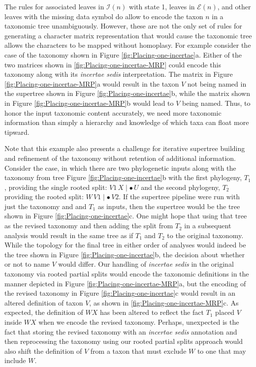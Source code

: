 \documentclass[english]{article}
\begin{document}
The rules for associated leaves in $\mathcal{I}(n)$ with state 1, leaves
     in $\mathcal{E}(n)$, and other leaves with the missing data symbol 
     do allow to encode the taxon $n$ in a taxonomic tree unambiguously.
However, these are not the only set of rules for generating a character matrix
    representation that would cause the taxonomic tree allows the characters to
    be mapped without homoplasy.
For example consider the case of the taxonomy shown in Figure \ref{fig:Placing-one-incertae}a.
Either of the two matrices shown in \ref{fig:Placing-one-incertae-MRP} could encode this
    taxonomy along with its \emph{incertae sedis} interpretation.
The matrix in Figure \ref{fig:Placing-one-incertae-MRP}a would result in the 
    taxon $V$ not being named in the supertree shown in Figure \ref{fig:Placing-one-incertae}b,
    while the matrix shown in Figure \ref{fig:Placing-one-incertae-MRP}b would lead
    to $V$ being named.
Thus, to honor the input taxonomic content accurately,
   we need more taxonomic information
    than simply a hierarchy and knowledge of which taxa can float more tipward.

Note that this example also presents a challenge for iterative supertree building and refinement
    of the taxonomy without retention of additional information.
Consider the case, in which there are two phylogenetic inputs along with the taxonomy from
    tree Figure \ref{fig:Placing-one-incertae}b with the first phylogeny, $T_1$, providing the single
    rooted split: $V1\,X \mid \bullet\,U$ and the second phylogeny, $T_2$ providing the 
    rooted split: $W\, V1 \mid \bullet\,V2$.
If the supertree pipeline were run with just the taxonomy and and $T_1$ as inputs, then the supertree
    would be the tree shown in Figure \ref{fig:Placing-one-incertae}c.
One might hope that using that tree as the revised taxonomy and then adding the split from $T_2$ in
    a subsequent analysis would result in the same tree as if $T_1$ and $T_2$ to the original taxonomy.
While the topology for the final tree in either order of analyses would indeed be the tree shown in 
    Figure \ref{fig:Placing-one-incertae}b, the decision about whether or not to name $V$ would differ.
Our handling of \emph{incertae sedis} in the original taxonomy via rooted partial splits
    would encode the taxonomic definitions in the manner depicted in Figure \ref{fig:Placing-one-incertae-MRP}a,
    but the encoding of the revised taxonomy in Figure \ref{fig:Placing-one-incertae}c would result
    in an altered definition of taxon $V$, as shown in \ref{fig:Placing-one-incertae-MRP}c.
As expected,  the definition of $WX$ has been altered to reflect the
    fact $T_1$ placed $V$ inside $WX$
    when we encode the revised taxonomy.
Perhaps, unexpected is the fact that storing the revised taxonomy with an \emph{incertae sedis} annotation
    and then reprocessing the taxonomy using our rooted partial splits approach would also shift
    the definition of $V$ from a taxon that must exclude $W$ to one that may include $W$.
\end{document}
